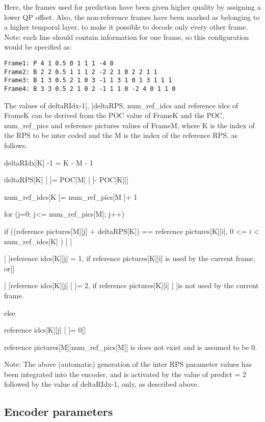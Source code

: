 \documentclass[a4paper,11pt]{jctvcdoc}
\begin{document}
Here, the frames used for prediction have been given higher
quality by assigning a lower QP offset. Also, the non-reference
frames have been marked as belonging to a higher temporal layer,
to make it possible to decode only every other frame. Note: each
line should contain information for one frame, so this
configuration would be specified as:

\begin{verbatim}
Frame1: P 4 1 0.5 0 1 1 1 -4 0
Frame2: B 2 2 0.5 1 1 1 2 -2 2 1 0 2 2 1 1
Frame3: B 1 3 0.5 2 1 0 3 -1 1 3 1 0 1 3 1 1 1
Frame4: B 3 3 0.5 2 1 0 2 -1 1 1 0 -2 4 0 1 1 0
\end{verbatim}

The values of deltaRIdx-1[, ]deltaRPS, num_ref_idcs and reference
idcs of FrameK can be derived from the POC value of FrameK and
the POC, num_ref_pics and reference pictures values of FrameM, where
K is the index of the RPS to be inter coded and the M is the
index of the reference RPS, as follows.

deltaRIdx[K] -1 = K - M - 1

deltaRPS[K] [ ]= POC[M] [ ]- POC[K][]

num_ref_idcs[K ]= num_ref_pics[M ]+ 1

for (j=0; j<= num_ref_pics[M]; j++)

{

if ((reference pictures[M][j] + deltaRPS[K]) == reference
pictures[K][i], 0 <= i < num_ref_idcs[K] ) [ ]{

[ ]reference idcs[K][j] = 1, if reference pictures[K][i] is used
by the current frame, or[]

[ ]reference idcs[K][j] [ ]= 2, if reference pictures[K][i] [ ]is
not used by the current frame.

}

else {

reference idcs[K][j] [ ]= 0[]

}

}

reference pictures[M][num_ref_pics[M]] is does not exist and is assumed to
be 0.

Note: The above (automatic) generation of the inter RPS parameter
values has been integrated into the encoder, and is activated by
the value of predict = 2 followed by the value of deltaRIdx-1,
only, as described above.



\subsection{Encoder parameters}
\end{document}
